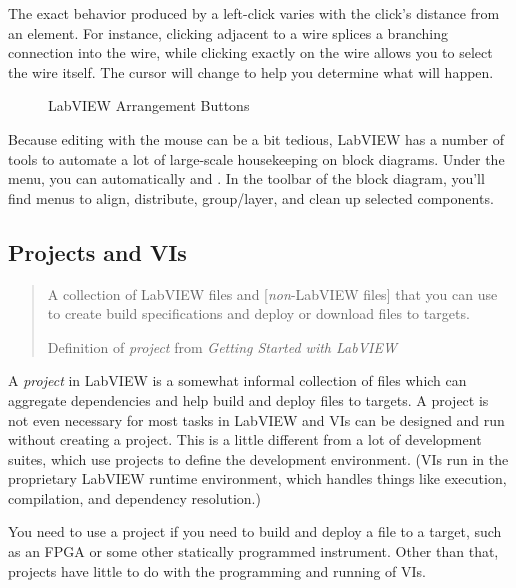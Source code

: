 The exact behavior produced by a left-click varies with the click's distance from an element.  For instance, clicking adjacent to a wire splices a branching connection into the wire, while clicking exactly on the wire allows you to select the wire itself.  The cursor will change to help you determine what will happen.

\begin{figure}[htbp]
  \centering
  \caption{LabVIEW Arrangement Buttons}
  \label{fig:eq_labview:block_diagram:arrange}
\end{figure}

Because editing with the mouse can be a bit tedious, LabVIEW has a number of tools to automate a lot of large-scale housekeeping on block diagrams.  Under the  menu, you can automatically  and .  In the toolbar of the block diagram, you'll find menus to align, distribute, group/layer, and clean up selected components.

\subsection{Projects and VIs}
\label{sec:eq_labview:projects_vis}

\begin{quote}
  A collection of LabVIEW files and [\textit{non}-LabVIEW files] that
  you can use to create build specifications and deploy or download
  files to targets.
  \begin{flushright}\dashem Definition of \textit{project} from \textit{Getting Started with LabVIEW}\end{flushright}
\end{quote}

A \textit{project} in LabVIEW is a somewhat informal collection of files which can aggregate dependencies and help build and deploy files to targets.  A project is not even necessary for most tasks in LabVIEW and VIs can be designed and run without creating a project.  This is a little different from a lot of development suites, which use projects to define the development environment.  (VIs run in the proprietary LabVIEW runtime environment, which handles things like execution, compilation, and dependency resolution.)  

You need to use a project if you need to build and deploy a file to a target, such as an FPGA or some other statically programmed instrument.  Other than that, projects have little to do with the programming and running of VIs.



